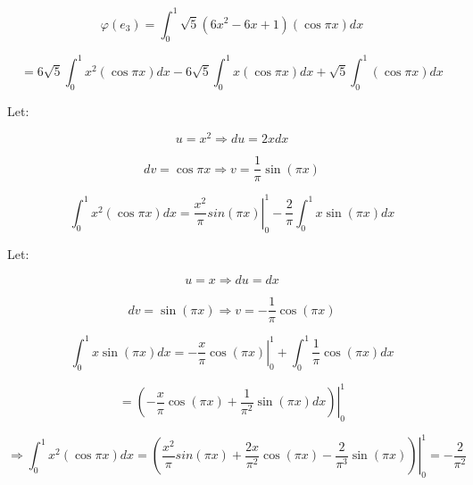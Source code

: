 \documentclass[fleqn]{article}
\begin{document}
\begin{enumerate}[nolistsep]
		\begin{equation*}
			\varphi(e_3) = \int_{0}^{1}{\sqrt{5}(6x^2 - 6x + 1)(\cos{{\pi}x})dx}
		\end{equation*}
		
		\begin{equation*}
			= 6\sqrt{5}\int_{0}^{1}{x^2(\cos{{\pi}x})dx} - 6\sqrt{5}\int_{0}^{1}{x(\cos{{\pi}x})dx} + \sqrt{5}\int_{0}^{1}{(\cos{{\pi}x})dx}
		\end{equation*}
		
		Let:
		
		\begin{equation*}
			u = x^2 \Rightarrow du = 2xdx
		\end{equation*}
		
		\begin{equation*}
			dv = \cos{{\pi}x} \Rightarrow v = \frac{1}{\pi}\sin({\pi}x)
		\end{equation*}
		
		\begin{equation*}
			\int_{0}^{1}{x^2(\cos{{\pi}x})dx} = \left.\frac{x^2}{\pi}sin({\pi}x)\right\vert_{0}^{1} - \frac{2}{\pi}\int_{0}^{1}{x\sin({\pi}x)dx}
		\end{equation*}
		
		Let:
		
		\begin{equation*}
			u = x \Rightarrow du = dx
		\end{equation*}
		
		\begin{equation*}
			dv = \sin{({\pi}x)} \Rightarrow v = -\frac{1}{\pi}\cos{({\pi}x)}
		\end{equation*}
		
		\begin{equation*}
			\int_{0}^{1}{x\sin({\pi}x)dx} = -\left.\frac{x}{\pi}\cos{({\pi}x)}\right\vert_{0}^{1} + \int_{0}^{1}{\frac{1}{\pi}\cos{({\pi}x)}dx}
		\end{equation*}
		
		\begin{equation*}
			= \left.\left(-\frac{x}{\pi}\cos{({\pi}x)} + \frac{1}{{\pi}^2}{\sin{({\pi}x)}dx}\right)\right\vert_{0}^{1}
		\end{equation*}
		
		\begin{equation*}
			\Rightarrow \int_{0}^{1}{x^2(\cos{{\pi}x})dx} = \left.\left(\frac{x^2}{\pi}sin({\pi}x) + \frac{2x}{{\pi}^2}\cos{({\pi}x)} - \frac{2}{{\pi}^3}\sin{({\pi}x)}\right)\right\vert_{0}^{1} = -\frac{2}{{\pi}^2}
		\end{equation*}
		

\end{enumerate}
\end{document}
